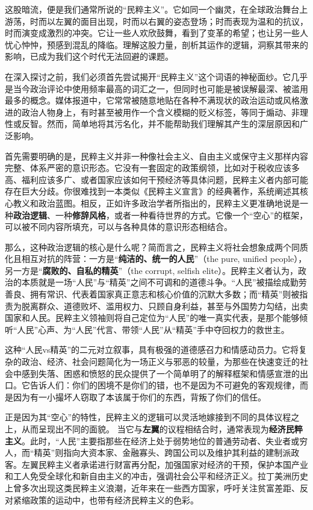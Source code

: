 这股暗流，便是我们通常所说的“民粹主义”。它如同一个幽灵，在全球政治舞台上游荡，时而以左翼的面目出现，时而以右翼的姿态登场；时而表现为温和的抗议，时而演变成激烈的冲突。它让一些人欢欣鼓舞，看到了变革的希望；也让另一些人忧心忡忡，预感到混乱的降临。理解这股力量，剖析其运作的逻辑，洞察其带来的影响，已成为我们这个时代无法回避的课题。

在深入探讨之前，我们必须首先尝试揭开“民粹主义”这个词语的神秘面纱。它几乎是当今政治评论中使用频率最高的词汇之一，但同时也可能是被误解最深、被滥用最多的概念。媒体报道中，它常常被随意地贴在各种不满现状的政治运动或风格激进的政治人物身上，有时甚至被用作一个含义模糊的贬义标签，等同于煽动、非理性或反智。然而，简单地将其污名化，并不能帮助我们理解其产生的深层原因和广泛影响。

首先需要明确的是，民粹主义并非一种像社会主义、自由主义或保守主义那样内容完整、体系严密的意识形态。它没有一套固定的政策纲领，比如对于税收应该多高、福利应该多广、或者国家应该如何干预经济等具体问题，民粹主义者内部可能存在巨大分歧。你很难找到一本类似《民粹主义宣言》的经典著作，系统阐述其核心教义和政治蓝图。相反，正如许多政治学者所指出的，民粹主义更准确地说是一种\textbf{政治逻辑}、一种\textbf{修辞风格}，或者一种看待世界的方式。它像一个“空心”的框架，可以被不同内容所填充，可以与各种具体的意识形态相结合。

那么，这种政治逻辑的核心是什么呢？简而言之，民粹主义将社会想象成两个同质化且相互对抗的阵营：一方是“\textbf{纯洁的、统一的人民}”（the pure, unified people），另一方是“\textbf{腐败的、自私的精英}”（the corrupt, selfish elite）。民粹主义者认为，政治的本质就是一场“人民”与“精英”之间不可调和的道德斗争。“人民”被描绘成勤劳善良、拥有常识、代表着国家真正意志和核心价值的沉默大多数；而“精英”则被指责为脱离群众、道德败坏、滥用权力、只顾自身利益，甚至与外国势力勾结，出卖国家和人民。民粹主义领袖则将自己定位为“人民”的唯一真实代表，是那个能够倾听“人民”心声、为“人民”代言、带领“人民”从“精英”手中夺回权力的救世主。

这种“人民vs精英”的二元对立叙事，具有极强的道德感召力和情感动员力。它将复杂的政治、经济、社会问题简化为一场正义与邪恶的较量，为那些在快速变迁的社会中感到失落、困惑和愤怒的民众提供了一个简单明了的解释框架和情感宣泄的出口。它告诉人们：你们的困境不是你们的错，也不是因为不可避免的客观规律，而是因为有一小撮坏人窃取了本该属于你们的东西，背叛了你们的信任。

正是因为其“空心”的特性，民粹主义的逻辑可以灵活地嫁接到不同的具体议程之上，从而呈现出不同的面貌。
当它与\textbf{左翼}的议程相结合时，通常表现为\textbf{经济民粹主义}。此时，“人民”主要指那些在经济上处于弱势地位的普通劳动者、失业者或穷人，而“精英”则指向大资本家、金融寡头、跨国公司以及维护其利益的建制派政客。左翼民粹主义者承诺进行财富再分配，加强国家对经济的干预，保护本国产业和工人免受全球化和新自由主义的冲击，强调社会公平和经济正义。拉丁美洲历史上曾多次出现这类民粹主义浪潮，近年来在一些西方国家，呼吁关注贫富差距、反对紧缩政策的运动中，也带有经济民粹主义的色彩。


